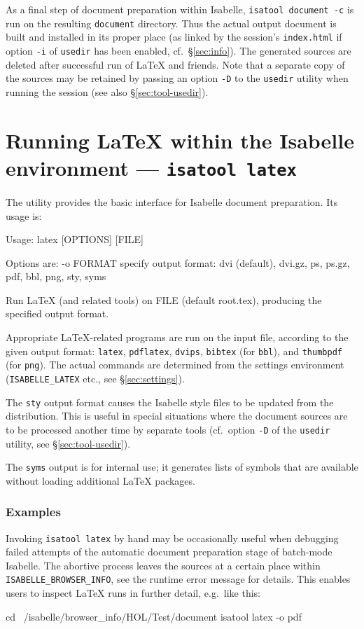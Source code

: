 \medskip As a final step of document preparation within Isabelle,
\texttt{isatool document -c} is run on the resulting \texttt{document}
directory.  Thus the actual output document is built and installed in its
proper place (as linked by the session's \texttt{index.html} if option
\texttt{-i} of \texttt{usedir} has been enabled, cf.\ \S\ref{sec:info}).  The
generated sources are deleted after successful run of {\LaTeX} and friends.
Note that a separate copy of the sources may be retained by passing an option
\texttt{-D} to the \texttt{usedir} utility when running the session (see also
\S\ref{sec:tool-usedir}).


\section{Running {\LaTeX} within the Isabelle environment --- \texttt{isatool latex}}
\label{sec:tool-latex}

The  utility provides the basic interface for Isabelle document
preparation.  Its usage is:
\begin{ttbox}
Usage: latex [OPTIONS] [FILE]

  Options are:
    -o FORMAT    specify output format: dvi (default), dvi.gz, ps,
                 ps.gz, pdf, bbl, png, sty, syms

  Run LaTeX (and related tools) on FILE (default root.tex),
  producing the specified output format.
\end{ttbox}
Appropriate {\LaTeX}-related programs are run on the input file, according to
the given output format: \texttt{latex}, \texttt{pdflatex}, \texttt{dvips},
\texttt{bibtex} (for \texttt{bbl}), and \texttt{thumbpdf} (for \texttt{png}).
The actual commands are determined from the settings environment
(\texttt{ISABELLE_LATEX} etc., see \S\ref{sec:settings}).

The \texttt{sty} output format causes the Isabelle style files to be updated
from the distribution.  This is useful in special situations where the
document sources are to be processed another time by separate tools (cf.\ 
option \texttt{-D} of the \texttt{usedir} utility, see
\S\ref{sec:tool-usedir}).

The \texttt{syms} output is for internal use; it generates lists of symbols
that are available without loading additional {\LaTeX} packages.


\subsubsection*{Examples}

Invoking \texttt{isatool latex} by hand may be occasionally useful when
debugging failed attempts of the automatic document preparation stage of
batch-mode Isabelle.  The abortive process leaves the sources at a certain
place within \texttt{ISABELLE_BROWSER_INFO}, see the runtime error message for
details.  This enables users to inspect {\LaTeX} runs in further detail, e.g.\ 
like this:

\begin{ttbox}
  cd ~/isabelle/browser_info/HOL/Test/document
  isatool latex -o pdf
\end{ttbox}


